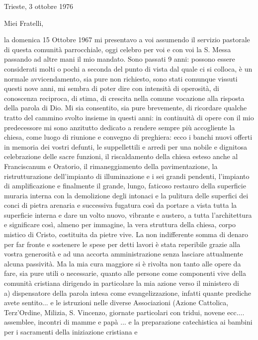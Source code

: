 \begin{flushright}
Trieste, 3 ottobre 1976
\end{flushright}
Miei Fratelli,\par
la domenica 15 Ottobre 1967 mi presentavo a voi assumendo il servizio pastorale di questa comunità parrocchiale, oggi celebro per voi e con voi la S. Messa passando ad altre mani il mio mandato.
Sono passati 9 anni: possono essere considerati molti o pochi a seconda del punto di vista dal quale ci si colloca, è un normale avvicendamento, sia pure non richiesto, sono stati comunque vissuti 
questi nove anni, mi sembra di poter dire con intensità di operosità, di conoscenza reciproca, di stima, di crescita nella comune vocazione alla risposta della parola di Dio.
Mi sia consentito, sia pure brevemente, di ricordare qualche tratto del cammino svolto insieme in questi anni:
in continuità di opere con il mio predecessore mi sono anzitutto dedicato a rendere sempre più accogliente la chiesa, come luogo di riunione e convegno di preghiera: 
ecco i banchi nuovi offerti in memoria dei vostri defunti, le suppellettili e arredi per una nobile e dignitosa celebrazione delle sacre funzioni, il riscaldamento della chiesa esteso anche al 
Franciscanum e Oratorio, il rimaneggiamento della pavimentazione, la ristrutturazione dell’impianto di illuminazione e i sei grandi pendenti, l’impianto di amplificazione e finalmente
il grande, lungo, faticoso restauro della superficie muraria interna con la demolizione degli intonaci e la pulitura delle superfici dei conci di pietra arenaria e successiva fugatura così
da portare a vista tutta la superficie interna e dare un volto nuovo, vibrante e austero, a tutta l'architettura e significare così, almeno per immagine, la vera struttura della chiesa, corpo
mistico di Cristo, costituita da pietre vive.
La non indifferente somma di denaro per far fronte e sostenere le spese per detti lavori è stata reperibile grazie alla vostra generosità e ad una accorta amministrazione senza lasciare
attualmente alcuna passività.
Ma la mia cura maggiore si è rivolta non tanto alle opere da fare, sia pure utili o necessarie, quanto alle persone come componenti vive della comunità cristiana dirigendo in particolare 
la mia azione verso il ministero di\\
a) dispensatore della parola intesa come evangelizzazione, infatti quante prediche avete sentito... e le istruzioni nelle diverse Associazioni (Azione Cattolica, Terz'Ordine, Milizia, 
S. Vincenzo, giornate particolari con tridui, novene ecc.... assemblee, incontri di mamme e papà ... e la preparazione catechistica ai bambini per i sacramenti della iniziazione cristiana e 
